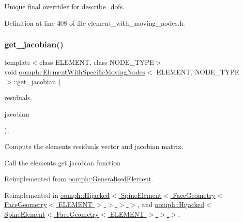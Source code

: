 Unique final overrider for describe\+\_\+dofs. 



Definition at line 408 of file element\+\_\+with\+\_\+moving\+\_\+nodes.\+h.

\mbox{\label{classoomph_1_1ElementWithSpecificMovingNodes_ad6f4748cbd652a05cf2bff03549e5aaa}} 
\subsubsection{\texorpdfstring{get\+\_\+jacobian()}{get\_jacobian()}}
{\footnotesize\ttfamily template$<$class E\+L\+E\+M\+E\+NT, class N\+O\+D\+E\+\_\+\+T\+Y\+PE$>$ \\
void \hyperlink{classoomph_1_1ElementWithSpecificMovingNodes}{oomph\+::\+Element\+With\+Specific\+Moving\+Nodes}$<$ E\+L\+E\+M\+E\+NT, N\+O\+D\+E\+\_\+\+T\+Y\+PE $>$\+::get\+\_\+jacobian (\begin{DoxyParamCaption}\item[{\hyperlink{classoomph_1_1Vector}{Vector}$<$ double $>$ \&}]{residuals,  }\item[{\hyperlink{classoomph_1_1DenseMatrix}{Dense\+Matrix}$<$ double $>$ \&}]{jacobian }\end{DoxyParamCaption})\hspace{0.3cm}{\ttfamily [inline]}, {\ttfamily [virtual]}}



Compute the element\textquotesingle{}s residuals vector and jacobian matrix. 

Call the element\textquotesingle{}s get jacobian function 

Reimplemented from \hyperlink{classoomph_1_1GeneralisedElement_ab915bdad7e6643e5e73a6d98bc7cf48e}{oomph\+::\+Generalised\+Element}.



Reimplemented in \hyperlink{classoomph_1_1Hijacked_a35778dccc9cf036c37ee569efe5b5f7c}{oomph\+::\+Hijacked$<$ Spine\+Element$<$ Face\+Geometry$<$ Face\+Geometry$<$ E\+L\+E\+M\+E\+N\+T $>$ $>$ $>$ $>$}, and \hyperlink{classoomph_1_1Hijacked_a35778dccc9cf036c37ee569efe5b5f7c}{oomph\+::\+Hijacked$<$ Spine\+Element$<$ Face\+Geometry$<$ E\+L\+E\+M\+E\+N\+T $>$ $>$ $>$}.



